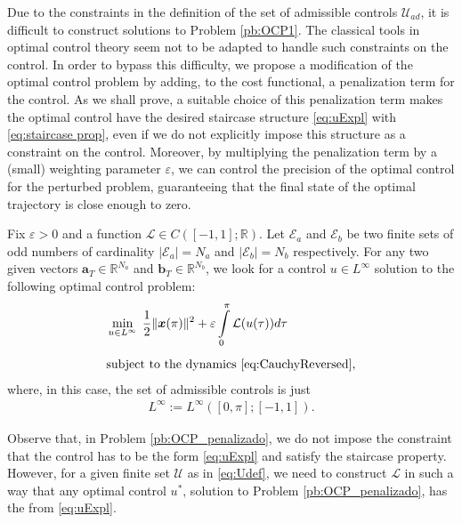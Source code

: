 \documentclass[twocolumn]{autart}    %
\begin{document}
Due to the constraints in the definition of the set of admissible controls $\mathcal{U}_{ad}$,  it is difficult to construct solutions to Problem \ref{pb:OCP1}. The classical tools in optimal control theory seem not to be adapted to handle such constraints on the control. In order to bypass this difficulty, we propose a modification of the optimal control problem by adding, to the cost functional, a penalization term for the control. As we shall prove, a suitable choice of this penalization term makes the optimal control have the desired staircase structure \eqref{eq:uExpl} with \eqref{eq:staircase prop}, even if we do not explicitly impose this structure as a constraint on the control. Moreover, by multiplying the penalization term by a (small) weighting parameter $\varepsilon$, we can control the precision of the optimal control for the perturbed problem, guaranteeing that the final state of the optimal trajectory is close enough to zero.

\bigskip

\begin{problem}\label{pb:OCP_penalizado}
Fix $\varepsilon>0$ and a function $\mathcal{L}\in C([-1,1];\mathbb{R})$.  Let $\mathcal{E} _a $ and $\mathcal{E} _b $ be two finite sets of odd numbers of cardinality $|\mathcal{E}_a| = N_a $ and $ |\mathcal{E} _b| = N_b$ respectively. For any two given vectors $\bm{a}_T \in \mathbb{R}^{N_a}$ and $\bm{b}_T \in \mathbb{R}^{N_b} $, we look for a control $u\in L^\infty$ solution to the following optimal control problem:
\begin{align*}
	&\displaystyle\min_{u \in L^\infty}\;\dfrac{1}{2} \|\bm{x}(\pi)\|^2 + \varepsilon \displaystyle\int_0^\pi \mathcal{L}(u(\tau)) d\tau 
	\\[5pt] 
	&\text{subject to the dynamics \eqref{eq:CauchyReversed}},
\end{align*}
where, in this case, the set of admissible controls is just 
\begin{align*}
	L^\infty:=L^\infty ([0,\pi]; [-1,1]).
\end{align*}
\end{problem}

Observe that, in Problem \ref{pb:OCP_penalizado}, we do not impose the constraint that the control has to be the form \eqref{eq:uExpl} and satisfy the staircase property. However, for a given finite set $\mathcal{U}$ as in \eqref{eq:Udef}, we need to construct $\mathcal{L}$ in such a way that any optimal control $u^\ast$, solution to Problem \ref{pb:OCP_penalizado}, has the from \eqref{eq:uExpl}.
\end{document}
